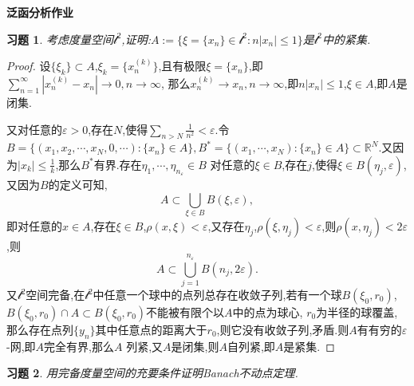 \documentclass[a4paper,oneside,12pt]{ctexart}
\theoremstyle{plain}
\newtheorem{exercise}{习题}
\theoremstyle{nonumberplain}
\theoremstyle{nonumberplain}
\newtheorem{proof}{证明.}
\newcommand{\R}{\mathbb{R}}
\newcommand{\cl}{\mathcal{l}}
\renewcommand{\epsilon}{\varepsilon}
\newcommand{\abs}[1]{\left\vert#1\right\vert}
\begin{document}
    
    \begin{center}
        \bfseries\LARGE
        泛函分析作业
    \end{center}

    \begin{exercise}
        \label{ex:1}
        考虑度量空间$\cl^2$,证明:$A:=\{\xi=\{x_n\}\in \cl^2:n\abs{x_n}\leqslant 1\}$是$\cl^2$中的紧集.
    \end{exercise}

    \begin{proof}
        设$\{\xi_k\}\subset A$,$\xi_k=\{x_n^{(k)}\}$,且有极限$\xi=\{x_n\}$,即$\sum_{n=1}^\infty \abs{x_n^{(k)}-x_n}\to 0,n\to \infty$,
        那么$x_n^{(k)}\to x_n,n\to\infty$,即$n\abs{x_n}\leqslant 1$,$\xi\in A$,即$A$是闭集.

        又对任意的$\epsilon>0$,存在$N$,使得$\sum_{n>N}\frac{1}{n^2}<\epsilon$.令$B=\{(x_1,x_2,\cdots,x_N,0,\cdots):\{x_n\}\in A\},B^\ast=\{
        (x_1,\cdots,x_N):\{x_n\}\in A\}\subset \R^N$.又因为$\abs{x_k}\leqslant\frac{1}{k}$,那么$B^\ast$有界.存在$\eta_1,\cdots,\eta_{n_\epsilon}\in B$
        对任意的$\xi\in B$,存在$j$,使得$\xi\in B(\eta_j,\epsilon)$,又因为$B$的定义可知,
        \begin{equation*}
            A\subset \bigcup_{\xi\in B}B(\xi,\epsilon),
        \end{equation*}
        即对任意的$x\in A$,存在$\xi\in B$,$\rho(x,\xi)<\epsilon$,又存在$\eta_j$,$\rho(\xi,\eta_j)<\epsilon$,则$\rho(x,\eta_j)<2\epsilon$,则
        \begin{equation*}
            A\subset \bigcup_{j=1}^{n_\epsilon}B(n_j,2\epsilon).
        \end{equation*}
        又$\cl^2$空间完备,在$\cl^2$中任意一个球中的点列总存在收敛子列,若有一个球$B(\xi_0,r_0)$,\\$B(\xi_0,r_0)\cap A\subset B(\xi_0,r_0)$不能被有限个以$A$中的点为球心,
        $r_0$为半径的球覆盖,那么存在点列$\{y_n\}$其中任意点的距离大于$r_0$,则它没有收敛子列,矛盾.则$A$有有穷的$\epsilon$-网,即$A$完全有界,那么$A$
        列紧,又$A$是闭集,则$A$自列紧,即$A$是紧集.
    \end{proof}

    \begin{exercise}
        \label{ex:2}
        用完备度量空间的充要条件证明Banach不动点定理.
    \end{exercise}
\end{document}
